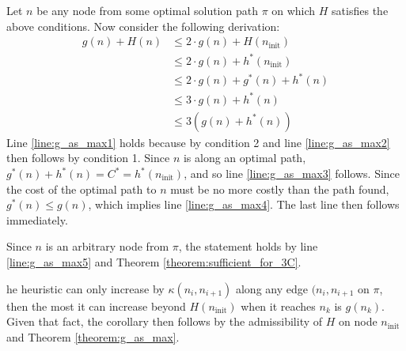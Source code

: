 Let $n$ be any node from some optimal solution path $\pi$ on which $H$ satisfies the above conditions.
Now consider the following derivation:
\begin{align}
g(n) + H(n) &\leq 2\cdot g(n) + H(n_{\mathrm{init}})\label{line:g_as_max1}\\ 
& \leq 2 \cdot g(n) + h^*(n_{\mathrm{init}})\label{line:g_as_max2}\\
& \leq 2 \cdot g(n) + g^*(n) + h^*(n)\label{line:g_as_max3}\\
& \leq 3 \cdot g(n) + h^*(n) \label{line:g_as_max4}\\
& \leq 3(g(n) + h^*(n))\label{line:g_as_max5}
\end{align}
Line \ref{line:g_as_max1} holds because by condition 2 and line \ref{line:g_as_max2} then follows by condition 1.
Since $n$ is along an optimal path, $g^*(n) + h^*(n)=C^* = h^*(n_{\mathrm{init}})$, and so line \ref{line:g_as_max3} follows.
Since the cost of the optimal path to $n$ must be no more costly than the path found, $g^*(n)\leq g(n)$, which implies line \ref{line:g_as_max4}.
The last line then follows immediately.

Since $n$ is an arbitrary node from $\pi$, the statement holds by line \ref{line:g_as_max5} and Theorem \ref{theorem:sufficient_for_3C}.


























he heuristic can only increase by $\kappa(n_i, n_{i+1})$ along any edge $(n_i, n_{i+1}$ on $\pi$, then the most it can increase beyond $H(n_{\mathrm{init}})$ when it reaches $n_k$ is $g(n_k)$.
Given that fact, the corollary then follows by the admissibility of $H$ on node $n_{\mathrm{init}}$ and Theorem \ref{theorem:g_as_max}.
%
%

